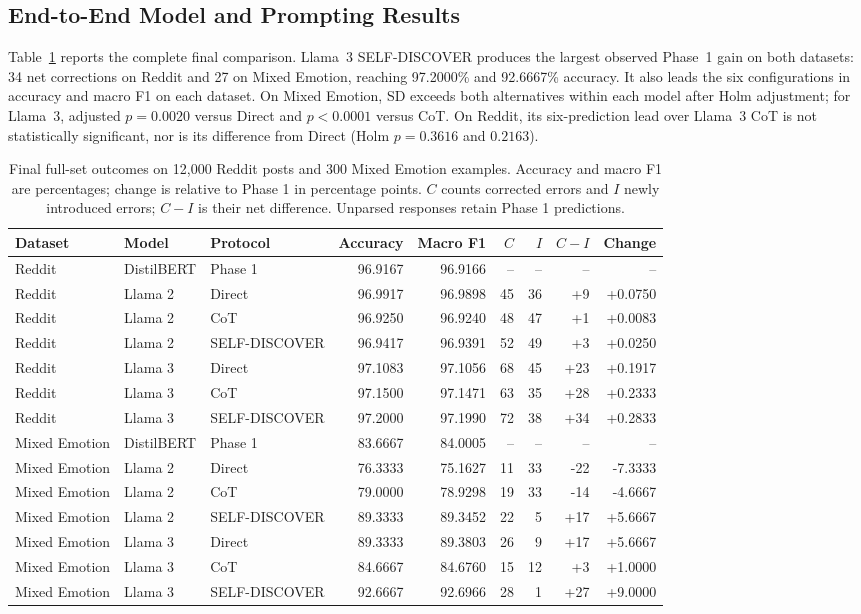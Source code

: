 \documentclass{ieeeaccess}
\begin{document}
\subsection{End-to-End Model and Prompting Results}
Table~\ref{tab:final-e2e} reports the complete final comparison. Llama~3 SELF-DISCOVER produces the largest observed Phase~1 gain on both datasets: 34 net corrections on Reddit and 27 on Mixed Emotion, reaching 97.2000\% and 92.6667\% accuracy. It also leads the six configurations in accuracy and macro F1 on each dataset. On Mixed Emotion, SD exceeds both alternatives within each model after Holm adjustment; for Llama~3, adjusted $p=0.0020$ versus Direct and $p<0.0001$ versus CoT. On Reddit, its six-prediction lead over Llama~3 CoT is not statistically significant, nor is its difference from Direct (Holm $p=0.3616$ and $0.2163$).
\begin{table}[t]
\centering\small
\setlength{\tabcolsep}{4pt}\renewcommand{\arraystretch}{1.14}
\caption{Final full-set outcomes on 12,000 Reddit posts and 300 Mixed Emotion examples. Accuracy and macro F1 are percentages; change is relative to Phase 1 in percentage points. $C$ counts corrected errors and $I$ newly introduced errors; $C-I$ is their net difference. Unparsed responses retain Phase 1 predictions.}
\label{tab:final-e2e}
\begin{tabular*}{\textwidth}{@{\extracolsep{\fill}}lllrrrrrr@{}}
\toprule
Dataset & Model & Protocol & Accuracy & Macro F1 & $C$ & $I$ & $C-I$ & Change \\
\midrule
Reddit & DistilBERT & Phase 1 & 96.9167 & 96.9166 & -- & -- & -- & -- \\
Reddit & Llama 2 & Direct & 96.9917 & 96.9898 & 45 & 36 & +9 & +0.0750 \\
Reddit & Llama 2 & CoT & 96.9250 & 96.9240 & 48 & 47 & +1 & +0.0083 \\
Reddit & Llama 2 & SELF-DISCOVER & 96.9417 & 96.9391 & 52 & 49 & +3 & +0.0250 \\
Reddit & Llama 3 & Direct & 97.1083 & 97.1056 & 68 & 45 & +23 & +0.1917 \\
Reddit & Llama 3 & CoT & 97.1500 & 97.1471 & 63 & 35 & +28 & +0.2333 \\
Reddit & Llama 3 & SELF-DISCOVER & 97.2000 & 97.1990 & 72 & 38 & +34 & +0.2833 \\
Mixed Emotion & DistilBERT & Phase 1 & 83.6667 & 84.0005 & -- & -- & -- & -- \\
Mixed Emotion & Llama 2 & Direct & 76.3333 & 75.1627 & 11 & 33 & -22 & -7.3333 \\
Mixed Emotion & Llama 2 & CoT & 79.0000 & 78.9298 & 19 & 33 & -14 & -4.6667 \\
Mixed Emotion & Llama 2 & SELF-DISCOVER & 89.3333 & 89.3452 & 22 & 5 & +17 & +5.6667 \\
Mixed Emotion & Llama 3 & Direct & 89.3333 & 89.3803 & 26 & 9 & +17 & +5.6667 \\
Mixed Emotion & Llama 3 & CoT & 84.6667 & 84.6760 & 15 & 12 & +3 & +1.0000 \\
Mixed Emotion & Llama 3 & SELF-DISCOVER & 92.6667 & 92.6966 & 28 & 1 & +27 & +9.0000 \\
\bottomrule
\end{tabular*}
\end{table}
\end{document}
